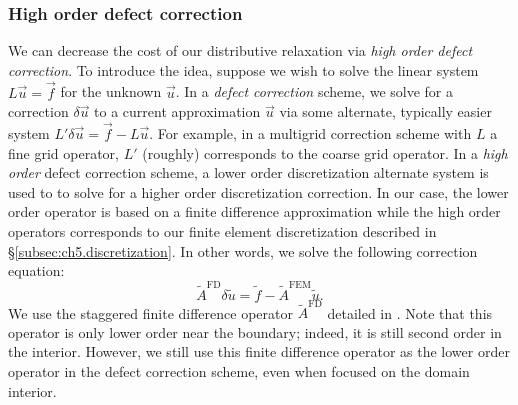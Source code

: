 \subsubsection{High order defect correction} \label{subsubsec:ch5.multigrid.relaxation.defectcorrection}

We can decrease the cost of our distributive relaxation via \emph{high order defect correction}. To introduce the idea, suppose we wish to solve the linear system $L \vec{u} = \vec{f}$ for the unknown $\vec{u}$. In a \emph{defect correction} scheme, we solve for a correction $\delta\vec{u}$ to a current approximation $\vec{u}$ via some alternate, typically easier system $L' \delta\vec{u} = \vec{f} - L \vec{u}$. For example, in a multigrid correction scheme with $L$ a fine grid operator, $L'$ (roughly) corresponds to the coarse grid operator. In a \emph{high order} defect correction scheme, a lower order discretization alternate system is used to to solve for a higher order discretization correction. In our case, the lower order operator is based on a finite difference approximation while the high order operators corresponds to our finite element discretization described in \S\ref{subsec:ch5.discretization}. In other words, we solve the following correction equation:
\begin{equation*}
\tilde{A}^{\text{FD}} \delta\tilde{u} = \tilde{f} - \tilde{A}^{\text{FEM}} \tilde{u}.
\end{equation*}
We use the staggered finite difference operator $\tilde{A}^{\text{FD}}$ detailed in \cite{Zhu.Yongning10}. Note that this operator is only lower order near the boundary; indeed, it is still second order in the interior. However, we still use this finite difference operator as the lower order operator in the defect correction scheme, even when focused on the domain interior.

